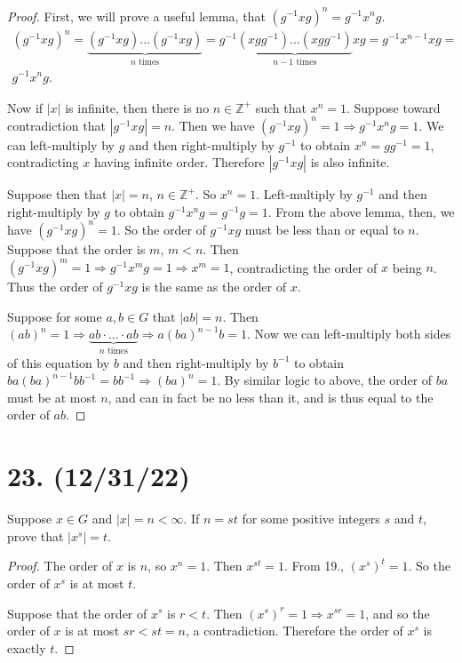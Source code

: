 \documentclass{article}
\begin{document}
\begin{proof}
      First, we will prove a useful lemma, that $(g^{-1}xg)^n = g^{-1}x^ng$.
      \begin{multline*}
            (g^{-1}xg)^n = \underbrace{(g^{-1}xg)...(g^{-1}xg)}_\text{$n$ times} = g^{-1}\underbrace{(xgg^{-1})...(xgg^{-1})}_\text{$n - 1$ times}xg = g^{-1}x^{n - 1}xg = \\g^{-1} x^n g.
      \end{multline*}

      Now if $|x|$ is infinite, then there is no $n \in \mathbb{Z}^+$ such that $x^n = 1$. Suppose toward contradiction that $|g^{-1}xg| = n$. Then we have $(g^{-1}xg)^n = 1 \Rightarrow g^{-1}x^n g = 1$. We can left-multiply by $g$ and then right-multiply by $g^{-1}$ to obtain $x^n = gg^{-1} = 1$, contradicting $x$ having infinite order. Therefore $|g^{-1}xg|$ is also infinite.

      Suppose then that $|x| = n$, $n \in \mathbb{Z}^+$. So $x^n = 1$. Left-multiply by $g^{-1}$ and then right-multiply by $g$ to obtain $g^{-1}x^n g = g^{-1}g = 1$. From the above lemma, then, we have $(g^{-1}xg)^n = 1$. So the order of $g^{-1}xg$ must be less than or equal to $n$. Suppose that the order is $m$, $m < n$. Then $(g^{-1}xg)^m = 1 \Rightarrow g^{-1}x^m g = 1 \Rightarrow x^m = 1$, contradicting the order of $x$ being $n$. Thus the order of $g^{-1}xg$ is the same as the order of $x$.

      Suppose for some $a, b \in G$ that $|ab| = n$. Then $(ab)^n = 1 \Rightarrow \underbrace{ab \cdot ... \cdot ab}_\text{$n$ times} \Rightarrow a(ba)^{n - 1}b = 1$. Now we can left-multiply both sides of this equation by $b$ and then right-multiply by $b^{-1}$ to obtain $ba(ba)^{n - 1}bb^{-1} = bb^{-1} \Rightarrow (ba)^n = 1$. By similar logic to above, the order of $ba$ must be at most $n$, and can in fact be no less than it, and is thus equal to the order of $ab$. 
\end{proof}

\section*{23. (12/31/22)}

Suppose $x \in G$ and $|x| = n < \infty$. If $n = st$ for some positive integers $s$ and $t$, prove that $|x^s| = t$.

\begin{proof}
      The order of $x$ is $n$, so $x^n = 1$. Then $x^{st} = 1$. From 19., $(x^s)^t = 1$. So the order of $x^s$ is at most $t$.

      Suppose that the order of $x^s$ is $r < t$. Then $(x^s)^r = 1 \Rightarrow x^{sr} = 1$, and so the order of $x$ is at most $sr < st = n$, a contradiction. Therefore the order of $x^s$ is exactly $t$. 
\end{proof}
\end{document}

